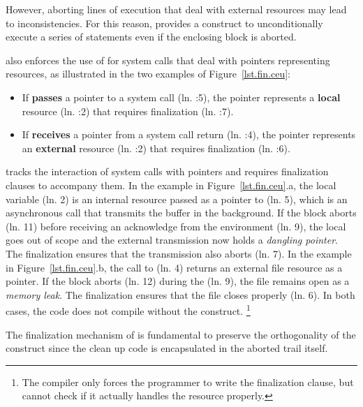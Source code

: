 However, aborting lines of execution that deal with external resources may lead
to inconsistencies.
%
For this reason, \CEU provides a  construct to unconditionally
execute a series of statements even if the enclosing block is aborted.

\CEU also enforces the use of  for system calls that deal with
pointers representing resources, as illustrated in the two examples of
Figure~\ref{lst.fin.ceu}:
%
\begin{itemize}
    \item If \CEU \textbf{passes} a pointer to a system call (ln. \ax:5), the
          pointer represents a \textbf{local} resource (ln. \ax:2) that
          requires finalization (ln. \ax:7).
    \item If \CEU \textbf{receives} a pointer from a system call return
          (ln.  \bx:4), the pointer represents an \textbf{external} resource
          (ln. \bx:2) that requires finalization (ln. \bx:6).
\end{itemize}
%
\CEU tracks the interaction of system calls with pointers and requires
finalization clauses to accompany them.
%
In the example in Figure~\ref{lst.fin.ceu}.a, the local variable 
(ln. 2) is an internal resource passed as a pointer to  (ln. 5),
which is an asynchronous call that transmits the buffer in the background.
If the block aborts (ln. 11) before receiving an acknowledge from the
environment (ln. 9), the local  goes out of scope and the external
transmission now holds a \emph{dangling pointer}.
The finalization ensures that the transmission also aborts (ln. 7).
%
In the example in Figure~\ref{lst.fin.ceu}.b, the call to  (ln.
4) returns an external file resource as a pointer.
If the block aborts (ln. 12) during the  (ln. 9), the file
remains open as a \emph{memory leak}.
The finalization ensures that the file closes properly (ln. 6).
%
In both cases, the code does not compile without the 
construct.%
\footnote{
The compiler only forces the programmer to write the finalization clause, but
cannot check if it actually handles the resource properly.
}

The finalization mechanism of \CEU is fundamental to preserve the orthogonality
of the  construct since the clean up code is encapsulated in the
aborted trail itself.
